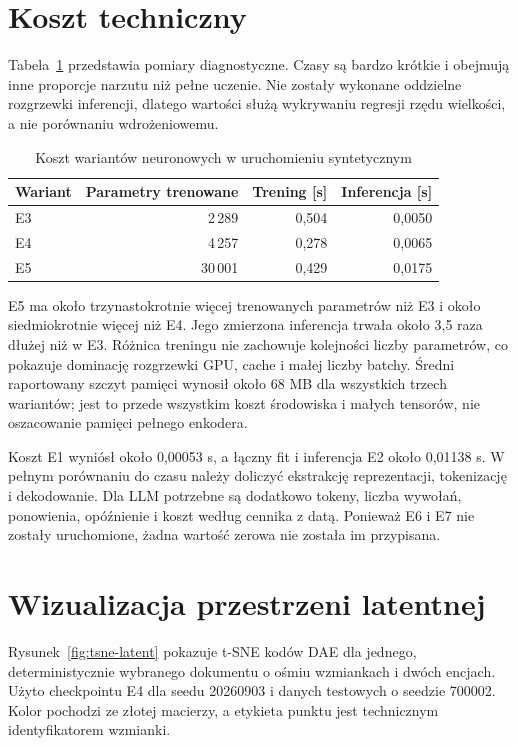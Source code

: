 \section{Koszt techniczny}
\label{sec:koszt-wynikow}

Tabela~\ref{tab:koszt-syntetyczny} przedstawia pomiary diagnostyczne. Czasy są bardzo krótkie i obejmują inne proporcje narzutu niż pełne uczenie. Nie zostały wykonane oddzielne rozgrzewki inferencji, dlatego wartości służą wykrywaniu regresji rzędu wielkości, a nie porównaniu wdrożeniowemu.

\begin{table}[htbp]
  \centering
  \caption{Koszt wariantów neuronowych w uruchomieniu syntetycznym}
  \label{tab:koszt-syntetyczny}
  \begin{tabular}{lrrr}
    \toprule
    Wariant & Parametry trenowane & Trening [s] & Inferencja [s] \\
    \midrule
    E3 & 2\,289 & 0,504 & 0,0050 \\
    E4 & 4\,257 & 0,278 & 0,0065 \\
    E5 & 30\,001 & 0,429 & 0,0175 \\
    \bottomrule
  \end{tabular}
\end{table}

E5 ma około trzynastokrotnie więcej trenowanych parametrów niż E3 i około siedmiokrotnie więcej niż E4. Jego zmierzona inferencja trwała około 3,5 raza dłużej niż w E3. Różnica treningu nie zachowuje kolejności liczby parametrów, co pokazuje dominację rozgrzewki GPU, cache i małej liczby batchy. Średni raportowany szczyt pamięci wynosił około 68 MB dla wszystkich trzech wariantów; jest to przede wszystkim koszt środowiska i małych tensorów, nie oszacowanie pamięci pełnego enkodera.

Koszt E1 wyniósł około 0,00053 s, a łączny fit i inferencja E2 około 0,01138 s. W pełnym porównaniu do czasu należy doliczyć ekstrakcję reprezentacji, tokenizację i dekodowanie. Dla LLM potrzebne są dodatkowo tokeny, liczba wywołań, ponowienia, opóźnienie i koszt według cennika z datą. Ponieważ E6 i E7 nie zostały uruchomione, żadna wartość zerowa nie została im przypisana.

\section{Wizualizacja przestrzeni latentnej}
\label{sec:latent-wyniki}

Rysunek~\ref{fig:tsne-latent} pokazuje t-SNE kodów DAE dla jednego, deterministycznie wybranego dokumentu o ośmiu wzmiankach i dwóch encjach. Użyto checkpointu E4 dla seedu 20260903 i danych testowych o seedzie 700002. Kolor pochodzi ze złotej macierzy, a etykieta punktu jest technicznym identyfikatorem wzmianki.

